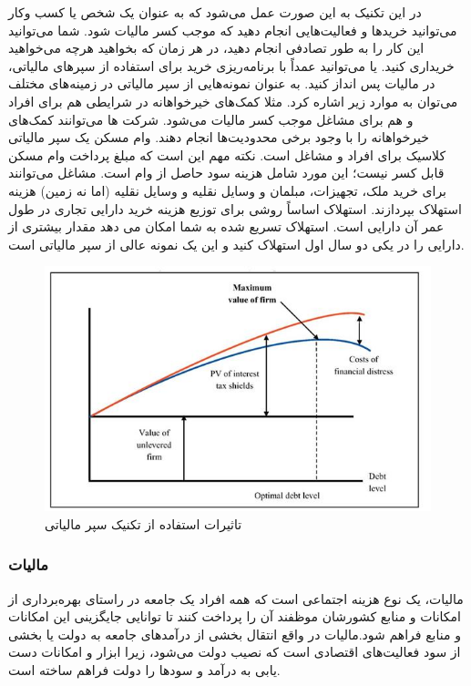 \documentclass{CCI2020}
\begin{document}
در این تکنیک به این صورت عمل می‌شود که به عنوان یک شخص یا کسب وکار می‌توانید خریدها و فعالیت‌هایی انجام دهید که موجب کسر مالیات شود.
شما می‌توانید این کار را به طور تصادفی انجام دهید، در هر زمان که بخواهید هرچه می‌خواهید خریداری کنید. یا می‌توانید عمداً با برنامه‌ریزی خرید برای استفاده از سپرهای مالیاتی‌، در مالیات پس انداز کنید.
به عنوان نمونه‌هایی از سپر مالیاتی در زمینه‌های مختلف می‌توان به موارد زیر اشاره کرد. 
 مثلا کمک‌های خیرخواهانه در شرایطی هم برای افراد و هم برای مشاغل  موجب کسر مالیات می‌شود. شرکت ها می‌توانند کمک‌های خیرخواهانه را با وجود برخی محدودیت‌ها انجام دهند.
وام مسکن یک سپر مالیاتی کلاسیک برای افراد و مشاغل است.   نکته مهم این است که مبلغ پرداخت وام مسکن قابل کسر نیست؛ این مورد شامل هزینه سود حاصل از وام  است.
مشاغل می‌توانند برای خرید ملک، تجهیزات، مبلمان و وسایل نقلیه و وسایل نقلیه (اما نه زمین) هزینه استهلاک بپردازند. استهلاک اساساً روشی برای توزیع هزینه خرید دارایی تجاری در طول عمر آن دارایی است.
استهلاک تسریع شده به شما امکان می دهد مقدار بیشتری از دارایی را در یکی دو سال اول استهلاک کنید و این یک نمونه عالی از سپر مالیاتی است.

\begin{figure}[htb]\centering
\includegraphics[height=0.6\hsize]{images/TaxShield.jpg}
\caption{تاثیرات استفاده از تکنیک سپر مالیاتی
\cite{TaxShield}}
\end{figure}

\subsubsection{مالیات}
مالیات، یک نوع هزینه اجتماعی است که همه افراد یک جامعه در راستای بهره‌برداری از امکانات و منابع کشورشان موظفند آن را پرداخت کنند تا توانایی جایگزینی این امکانات و منابع فراهم شود.مالیات در واقع انتقال بخشی از درآمد‌های جامعه به دولت یا بخشی از سود فعالیت‌های اقتصادی است که نصیب دولت می‌شود، زیرا ابزار و امکانات دست یابی به درآمد و سود‌ها را دولت فراهم ساخته ‌است.
\end{document}
